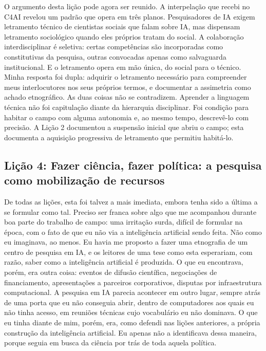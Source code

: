 O argumento desta lição pode agora ser reunido. A interpelação que recebi no C4AI revelou um padrão que opera em três planos. Pesquisadores de IA exigem letramento técnico de cientistas sociais que falam sobre IA, mas dispensam letramento sociológico quando eles próprios tratam do social. A colaboração interdisciplinar é seletiva: certas competências são incorporadas como constitutivas da pesquisa, outras convocadas apenas como salvaguarda institucional. E o letramento opera em mão única, do social para o técnico. Minha resposta foi dupla: adquirir o letramento necessário para compreender meus interlocutores nos seus próprios termos, e documentar a assimetria como achado etnográfico. As duas coisas não se contradizem. Aprender a linguagem técnica não foi capitulação diante da hierarquia disciplinar. Foi condição para habitar o campo com alguma autonomia e, ao mesmo tempo, descrevê-lo com precisão. A Lição 2 documentou a suspensão inicial que abriu o campo; esta documenta a aquisição progressiva de letramento que permitiu habitá-lo.

\subsection{Lição 4: Fazer ciência, fazer política: a pesquisa como mobilização de recursos}
\label{subsec:licao4}

De todas as lições, esta foi talvez a mais imediata, embora tenha sido a última a se formular como tal. Preciso ser franca sobre algo que me acompanhou durante boa parte do trabalho de campo: uma irritação surda, difícil de formular na época, com o fato de que eu não via a inteligência artificial sendo feita. Não como eu imaginava, ao menos. Eu havia me proposto a fazer uma etnografia de um centro de pesquisa em IA, e os leitores de uma tese como esta esperariam, com razão, saber como a inteligência artificial é produzida. O que eu encontrava, porém, era outra coisa: eventos de difusão científica, negociações de financiamento, apresentações a parceiros corporativos, disputas por infraestrutura computacional. A pesquisa em IA parecia acontecer em outro lugar, sempre atrás de uma porta que eu não conseguia abrir, dentro de computadores aos quais eu não tinha acesso, em reuniões técnicas cujo vocabulário eu não dominava. O que eu tinha diante de mim, porém, era, como defendi nas lições anteriores, a própria construção da inteligência artificial. Eu apenas não a identificava dessa maneira, porque seguia em busca da ciência por trás de toda aquela política.

